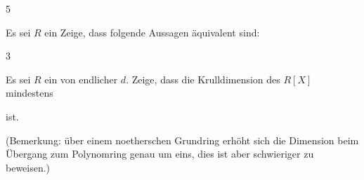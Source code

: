 {} {}



{5}

{


Es sei $R$ ein
Zeige, dass folgende Aussagen äquivalent sind:


}

{} {}



{3}

{


Es sei $R$ ein
von endlicher
$d$. Zeige, dass die Krulldimension des
$R[X]$ mindestens

 ist.


}

{(Bemerkung: über einem noetherschen Grundring erhöht sich die Dimension beim Übergang zum Polynomring genau um eins, dies ist aber schwieriger zu beweisen.)} {}
